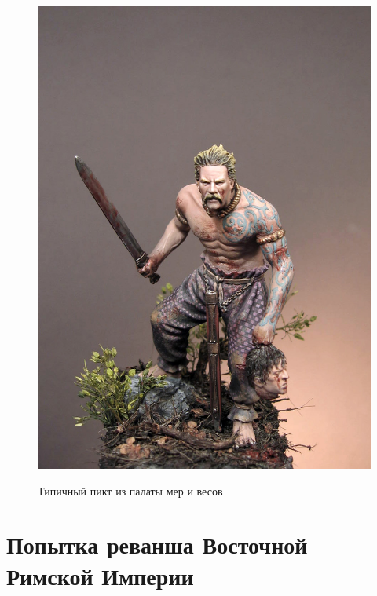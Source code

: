 \begin{figure}[h!tb]
	\centering\includegraphics[scale=0.2]{Relig_gambit/1572932401136943899.png}
	\label{fig:gambit8} %
	\caption{Типичный пикт из палаты мер и весов	}
\end{figure}

\section{Попытка реванша Восточной Римской Империи}

